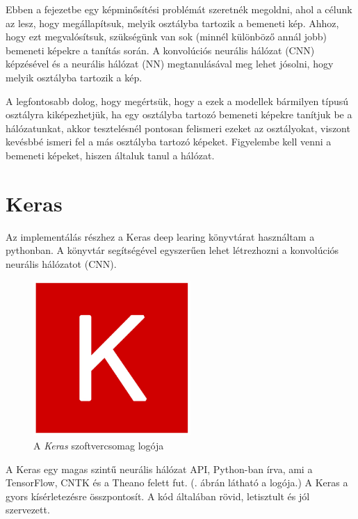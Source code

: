 



Ebben a fejezetbe egy képminősítési problémát szeretnék megoldni, ahol a célunk az lesz, hogy megállapítsuk, melyik osztályba tartozik a bemeneti kép. Ahhoz, hogy ezt megvalósítsuk, szükségünk van sok (minnél különböző annál jobb) bemeneti képekre a tanítás során. A konvolúciós neurális hálózat (CNN) képzésével és a neurális hálózat (NN) megtanulásával meg lehet jósolni, hogy melyik osztályba tartozik a kép.

A legfontosabb dolog, hogy megértsük, hogy a ezek a modellek bármilyen típusú osztályra kiképezhetjük, ha egy osztályba tartozó bemeneti képekre tanítjuk be a hálózatunkat, akkor tesztelésnél pontosan felismeri ezeket az osztályokat, viszont kevésbbé ismeri fel a más osztályba tartozó képeket. Figyelembe kell venni a bemeneti képeket, hiszen általuk tanul a hálózat.

\section{Keras}

Az implementálás részhez a Keras deep learing könyvtárat használtam a pythonban. A könyvtár segítségével egyszerűen lehet létrezhozni a konvolúciós neurális hálózatot (CNN).

\begin{figure}[h]
\centering
\includegraphics[scale=0.5]{images/keras}
\caption{A \textit{Keras} szoftvercsomag logója}
\label{fig:k}
\end{figure}

A Keras egy magas szintű neurális hálózat API, Python-ban írva, ami a TensorFlow, CNTK és a Theano felett fut. (. ábrán látható a logója.) A Keras a gyors kísérletezésre összpontosít. A kód általában rövid, letisztult és jól szervezett.

